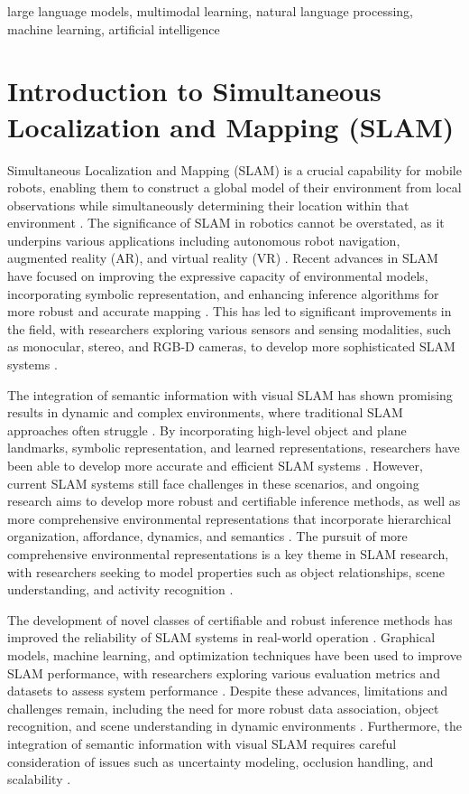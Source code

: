 \documentclass[conference]{IEEEtran}
\begin{document}
\begin{IEEEkeywords}
large language models, multimodal learning, natural language processing, machine learning, artificial intelligence
\end{IEEEkeywords}


\section{Introduction to Simultaneous Localization and Mapping (SLAM)}
Simultaneous Localization and Mapping (SLAM) is a crucial capability for mobile robots, enabling them to construct a global model of their environment from local observations while simultaneously determining their location within that environment \cite{b1}. The significance of SLAM in robotics cannot be overstated, as it underpins various applications including autonomous robot navigation, augmented reality (AR), and virtual reality (VR) \cite{b2}. Recent advances in SLAM have focused on improving the expressive capacity of environmental models, incorporating symbolic representation, and enhancing inference algorithms for more robust and accurate mapping \cite{b3}. This has led to significant improvements in the field, with researchers exploring various sensors and sensing modalities, such as monocular, stereo, and RGB-D cameras, to develop more sophisticated SLAM systems \cite{b4}.

The integration of semantic information with visual SLAM has shown promising results in dynamic and complex environments, where traditional SLAM approaches often struggle \cite{b5}. By incorporating high-level object and plane landmarks, symbolic representation, and learned representations, researchers have been able to develop more accurate and efficient SLAM systems \cite{b6}. However, current SLAM systems still face challenges in these scenarios, and ongoing research aims to develop more robust and certifiable inference methods, as well as more comprehensive environmental representations that incorporate hierarchical organization, affordance, dynamics, and semantics \cite{b7}. The pursuit of more comprehensive environmental representations is a key theme in SLAM research, with researchers seeking to model properties such as object relationships, scene understanding, and activity recognition \cite{b8}.

The development of novel classes of certifiable and robust inference methods has improved the reliability of SLAM systems in real-world operation \cite{b9}. Graphical models, machine learning, and optimization techniques have been used to improve SLAM performance, with researchers exploring various evaluation metrics and datasets to assess system performance \cite{b10}. Despite these advances, limitations and challenges remain, including the need for more robust data association, object recognition, and scene understanding in dynamic environments \cite{b11}. Furthermore, the integration of semantic information with visual SLAM requires careful consideration of issues such as uncertainty modeling, occlusion handling, and scalability \cite{b12}.
\end{document}
